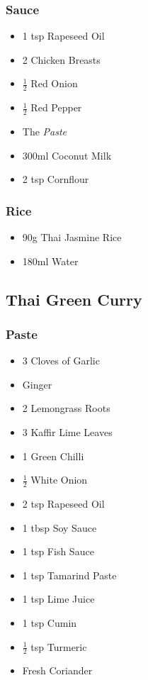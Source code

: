 \documentclass[11pt, english]{article}
\begin{document}
		\subsubsection*{Sauce}

	\begin{itemize}
        \setlength\itemsep{0cm}
                \item 1 tsp Rapeseed Oil
		\item 2 Chicken Breasts
		\item $\frac{1}{2}$ Red Onion
		\item $\frac{1}{2}$ Red Pepper
		\item The \textit{Paste}
		\item 300ml Coconut Milk
		\item 2 tsp Cornflour
        \end{itemize}

		\subsubsection*{Rice}

	\begin{itemize}
        \setlength\itemsep{0cm}
                \item 90g Thai Jasmine Rice
		\item 180ml Water
        \end{itemize}

\newpage

	\subsection{Thai Green Curry}

		\subsubsection*{Paste}

	\begin{itemize}
        \setlength\itemsep{0cm}
                \item 3 Cloves of Garlic
		\item Ginger
		\item 2 Lemongrass Roots
		\item 3 Kaffir Lime Leaves
		\item 1 Green Chilli
		\item $\frac{1}{2}$ White Onion
		\item 2 tsp Rapeseed Oil
		\item 1 tbsp Soy Sauce
		\item 1 tsp Fish Sauce
		\item 1 tsp Tamarind Paste
		\item 1 tsp Lime Juice
		\item 1 tsp Cumin
		\item $\frac{1}{2}$ tsp Turmeric
		\item Fresh Coriander
        \end{itemize}
\end{document}

